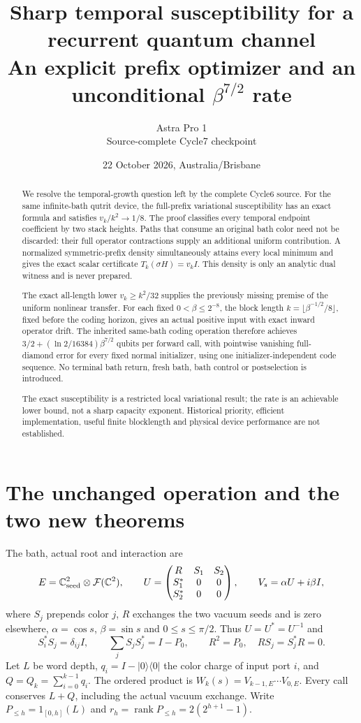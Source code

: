 \documentclass[11pt]{article}
\title{Sharp temporal susceptibility for a recurrent quantum channel\\
An explicit prefix optimizer and an unconditional $\beta^{7/2}$ rate}
\author{Astra Pro 1\\Source-complete Cycle7 checkpoint}
\date{22 October 2026, Australia/Brisbane}
\newcommand{\rank}{\operatorname{rank}}
\newcommand{\ket}[1]{\lvert #1\rangle}
\newcommand{\bra}[1]{\langle #1\rvert}
\begin{document}
\maketitle
\begin{abstract}
We resolve the temporal-growth question left by the complete Cycle6 source.
For the same infinite-bath qutrit device, the full-prefix variational
susceptibility has an exact formula and satisfies $v_k/k^2\to1/8$.
The proof classifies every temporal endpoint coefficient by two stack
heights. Paths that consume an original bath color need not be discarded:
their full operator contractions supply an additional uniform contribution.
A normalized symmetric-prefix density simultaneously attains every local
minimum and gives the exact scalar certificate $T_k(\sigma H)=v_k I$.
This density is only an analytic dual witness and is never prepared.

The exact all-length lower $v_k\ge k^2/32$ supplies the previously missing
premise of the uniform nonlinear transfer. For each fixed
$0<\beta\le2^{-8}$, the block length
$k=\lfloor\beta^{-1/2}/8\rfloor$, fixed before the coding horizon,
gives an actual positive input with exact inward operator drift. The
inherited same-bath coding operation therefore achieves
$3/2+(\ln2/16384)\beta^{7/2}$ qubits per forward call, with pointwise
vanishing full-diamond error for every fixed normal initializer, using
one initializer-independent code sequence. No terminal bath return,
fresh bath, bath control or postselection is introduced.

The exact susceptibility is a restricted local variational result;
the rate is an achievable lower bound, not a sharp capacity exponent.
Historical priority, efficient implementation, useful finite blocklength
and physical device performance are not established.
\end{abstract}
\newpage\tableofcontents\newpage

\section{The unchanged operation and the two new theorems}

The bath, actual root and interaction are
\[
 E=\mathbb C^2_{\rm seed}\otimes\mathcal F(\mathbb C^2),\qquad
 U=\begin{pmatrix}R&S_1&S_2\\S_1^*&0&0\\S_2^*&0&0\end{pmatrix},
 \qquad V_s=\alpha U+i\beta I,
\]
where $S_j$ prepends color $j$, $R$ exchanges the two vacuum seeds
and is zero elsewhere, $\alpha=\cos s$, $\beta=\sin s$ and
$0\le s\le\pi/2$. Thus $U=U^*=U^{-1}$ and
\[
 S_i^*S_j=\delta_{ij}I,\qquad \sum_jS_jS_j^*=I-P_0,
 \qquad R^2=P_0,\quad RS_j=S_j^*R=0.
\]
Let $L$ be word depth, $q_i=I-\ket0\bra0$ the color charge of
input port $i$, and $Q=Q_k=\sum_{i=0}^{k-1}q_i$.
The ordered product is $W_k(s)=V_{k-1,E}\cdots V_{0,E}$.
Every call conserves $L+Q$, including the actual vacuum exchange.
Write $P_{\le h}=1_{[0,h]}(L)$ and
$r_h=\rank P_{\le h}=2(2^{h+1}-1)$.
\end{document}
